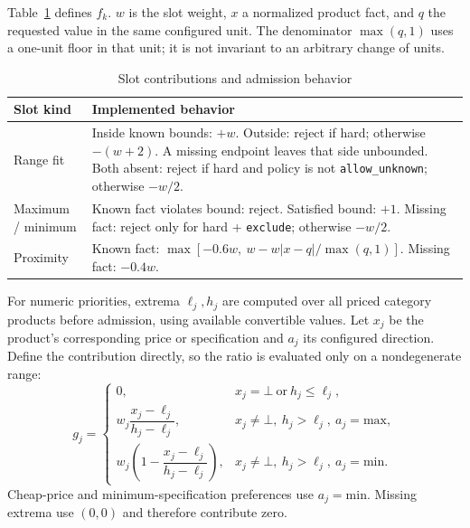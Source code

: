 \documentclass[conference,a4paper]{IEEEtran}
\newcommand{\code}[1]{\texttt{#1}}
\begin{document}
Table~\ref{tab:slots} defines $f_k$. $w$ is the slot weight, $x$ a normalized product fact, and $q$ the requested value in the same configured unit. The denominator $\max(q,1)$ uses a one-unit floor in that unit; it is not invariant to an arbitrary change of units.

\begin{table}[t]
\caption{Slot contributions and admission behavior}
\label{tab:slots}
\centering\footnotesize
\begin{tabularx}{\columnwidth}{@{}p{1.35cm}X@{}}
\toprule
Slot kind & Implemented behavior\\
\midrule
Range fit & Inside known bounds: $+w$. Outside: reject if hard; otherwise $-(w+2)$. A missing endpoint leaves that side unbounded. Both absent: reject if hard and policy is not \code{allow\_unknown}; otherwise $-w/2$.\\
Maximum / minimum & Known fact violates bound: reject. Satisfied bound: $+1$. Missing fact: reject only for hard + \code{exclude}; otherwise $-w/2$.\\
Proximity & Known fact: $\max[-0.6w,\ w-w|x-q|/\max(q,1)]$. Missing fact: $-0.4w$.\\
\bottomrule
\end{tabularx}
\end{table}

For numeric priorities, extrema $\ell_j,h_j$ are computed over all priced category products before admission, using available convertible values. Let $x_j$ be the product's corresponding price or specification and $a_j$ its configured direction. Define the contribution directly, so the ratio is evaluated only on a nondegenerate range:
\[
g_j=\begin{cases}
0,&x_j=\bot\ \text{or}\ h_j\le\ell_j,\\
w_j\dfrac{x_j-\ell_j}{h_j-\ell_j},&x_j\ne\bot,\ h_j>\ell_j,\ a_j=\mathrm{max},\\
w_j\left(1-\dfrac{x_j-\ell_j}{h_j-\ell_j}\right),&x_j\ne\bot,\ h_j>\ell_j,\ a_j=\mathrm{min}.
\end{cases}
\]
Cheap-price and minimum-specification preferences use $a_j=\mathrm{min}$. Missing extrema use $(0,0)$ and therefore contribute zero.
\end{document}
